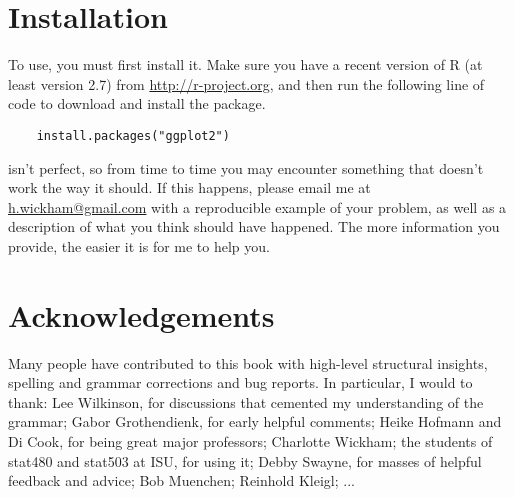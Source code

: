 \section{Installation}\label{sub:installation}

To use\ggplot, you must first install it. Make sure you have a recent version of R (at least version 2.7) from \url{http://r-project.org}, and then run the following line of code to download and install the \ggplot package.  

\begin{verbatim}
	install.packages("ggplot2")
\end{verbatim}

% 
% 
% 

\ggplot isn't perfect, so from time to time you may encounter something that doesn't work the way it should.  If this happens, please email me at \href{mailto:h.wickham@gmail.com}{h.wickham@gmail.com} with a reproducible example of your problem, as well as a description of what you think should have happened.  The more information you provide, the easier it is for me to help you.

\section{Acknowledgements}\label{sec:acknolwedgements}

Many people have contributed to this book with high-level structural insights, spelling and grammar corrections and bug reports.  In particular, I would to thank: Lee Wilkinson, for discussions that cemented my understanding of the grammar; Gabor Grothendienk, for early helpful comments; Heike Hofmann and Di Cook, for being great major professors; Charlotte Wickham; the students of stat480 and stat503 at ISU, for using it; Debby Swayne, for masses of helpful feedback and advice; Bob Muenchen; Reinhold Kleigl; ...


